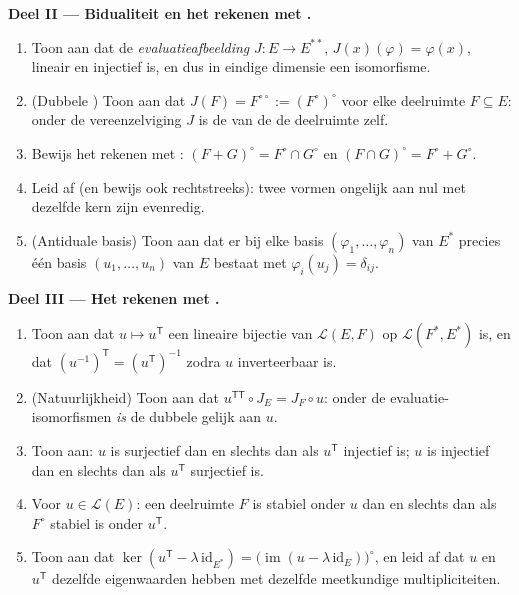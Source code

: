 \begin{problem}
\medskip
\noindent\textbf{Deel II --- Bidualiteit en het rekenen met
.}
\begin{enumerate}[resume]
  \item Toon aan dat de \emph{evaluatieafbeelding} $J \colon E \to
        E^{**}$, $J(x)(\varphi) = \varphi(x)$, lineair en
        injectief is, en dus in eindige dimensie een isomorfisme.
  \item (Dubbele ) Toon aan dat $J(F) = F^{\circ\circ}
        := (F^\circ)^\circ$ voor elke deelruimte $F \subseteq E$:
        onder de vereenzelviging $J$ is de  van de
         de deelruimte zelf.
  \item Bewijs het rekenen met : $(F + G)^\circ =
        F^\circ \cap G^\circ$ en $(F \cap G)^\circ = F^\circ +
        G^\circ$.
  \item Leid af (en bewijs ook rechtstreeks): twee vormen ongelijk
        aan nul met dezelfde kern zijn evenredig.
  \item (Antiduale basis) Toon aan dat er bij elke basis
        $(\varphi_1, \dots, \varphi_n)$ van $E^*$ precies één
        basis $(u_1, \dots, u_n)$ van $E$ bestaat met
        $\varphi_i(u_j) = \delta_{ij}$.
\end{enumerate}

\medskip
\noindent\textbf{Deel III --- Het rekenen met .}
\begin{enumerate}[resume]
  \item Toon aan dat $u \mapsto u^{\mathsf T}$ een lineaire
        bijectie van $\mathcal{L}(E, F)$ op $\mathcal{L}(F^*,
        E^*)$ is, en dat $(u^{-1})^{\mathsf T} = (u^{\mathsf
        T})^{-1}$ zodra $u$ inverteerbaar is.
  \item (Natuurlijkheid) Toon aan dat $u^{\mathsf T\mathsf T} \circ
        J_E = J_F \circ u$: onder de evaluatie-isomorfismen
        \emph{is} de dubbele  gelijk aan $u$.
  \item Toon aan: $u$ is surjectief dan en slechts dan als
        $u^{\mathsf T}$ injectief is; $u$ is injectief dan en
        slechts dan als $u^{\mathsf T}$ surjectief is.
  \item Voor $u \in \mathcal{L}(E)$: een deelruimte $F$ is stabiel
        onder $u$ dan en slechts dan als $F^\circ$ stabiel is
        onder $u^{\mathsf T}$.
  \item Toon aan dat $\ker(u^{\mathsf T} - \lambda\,
        \mathrm{id}_{E^*}) = \bigl(\operatorname{im}(u - \lambda\,
        \mathrm{id}_E)\bigr)^\circ$, en leid af dat $u$ en
        $u^{\mathsf T}$ dezelfde eigenwaarden hebben met dezelfde
        meetkundige multipliciteiten.
\end{enumerate}


\end{problem}
